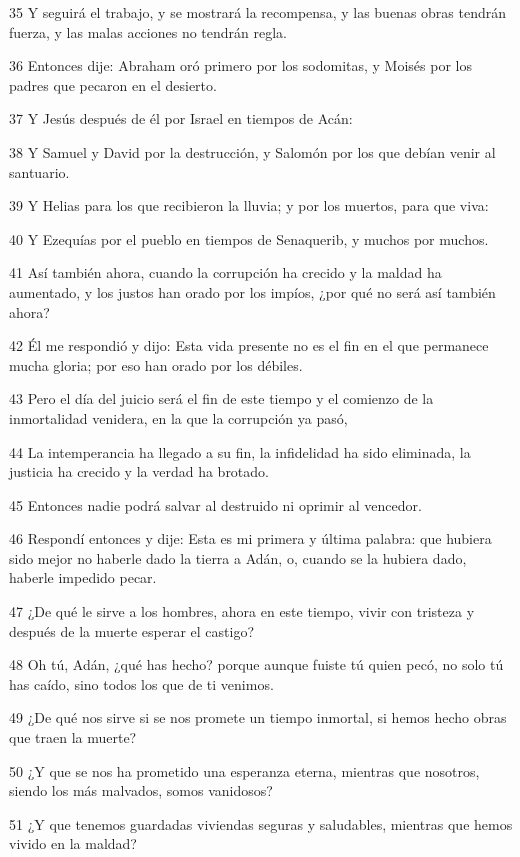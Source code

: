 \par 35 Y seguirá el trabajo, y se mostrará la recompensa, y las buenas obras tendrán fuerza, y las malas acciones no tendrán regla.
\par 36 Entonces dije: Abraham oró primero por los sodomitas, y Moisés por los padres que pecaron en el desierto.
\par 37 Y Jesús después de él por Israel en tiempos de Acán:
\par 38 Y Samuel y David por la destrucción, y Salomón por los que debían venir al santuario.
\par 39 Y Helias para los que recibieron la lluvia; y por los muertos, para que viva:
\par 40 Y Ezequías por el pueblo en tiempos de Senaquerib, y muchos por muchos.
\par 41 Así también ahora, cuando la corrupción ha crecido y la maldad ha aumentado, y los justos han orado por los impíos, ¿por qué no será así también ahora?
\par 42 Él me respondió y dijo: Esta vida presente no es el fin en el que permanece mucha gloria; por eso han orado por los débiles.
\par 43 Pero el día del juicio será el fin de este tiempo y el comienzo de la inmortalidad venidera, en la que la corrupción ya pasó,
\par 44 La intemperancia ha llegado a su fin, la infidelidad ha sido eliminada, la justicia ha crecido y la verdad ha brotado.
\par 45 Entonces nadie podrá salvar al destruido ni oprimir al vencedor.
\par 46 Respondí entonces y dije: Esta es mi primera y última palabra: que hubiera sido mejor no haberle dado la tierra a Adán, o, cuando se la hubiera dado, haberle impedido pecar.
\par 47 ¿De qué le sirve a los hombres, ahora en este tiempo, vivir con tristeza y después de la muerte esperar el castigo?
\par 48 Oh tú, Adán, ¿qué has hecho? porque aunque fuiste tú quien pecó, no solo tú has caído, sino todos los que de ti venimos.
\par 49 ¿De qué nos sirve si se nos promete un tiempo inmortal, si hemos hecho obras que traen la muerte?
\par 50 ¿Y que se nos ha prometido una esperanza eterna, mientras que nosotros, siendo los más malvados, somos vanidosos?
\par 51 ¿Y que tenemos guardadas viviendas seguras y saludables, mientras que hemos vivido en la maldad?
